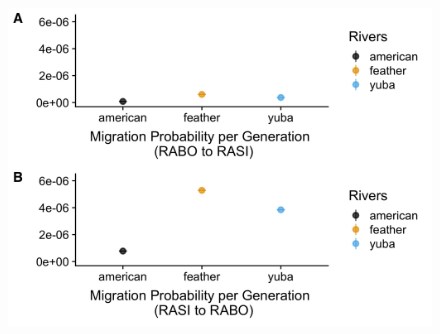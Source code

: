 \documentclass[proquest,12pt,final]{ucthesis-CA2012} %
\begin{document}
\begin{ucmainmatter}
\begin{figure}

{\centering \includegraphics[width=1\linewidth]{figure/ch2/figure_06_coalescent_ancMigration_ptsCI} 

}


\end{figure}
\end{ucmainmatter}
\end{document}
